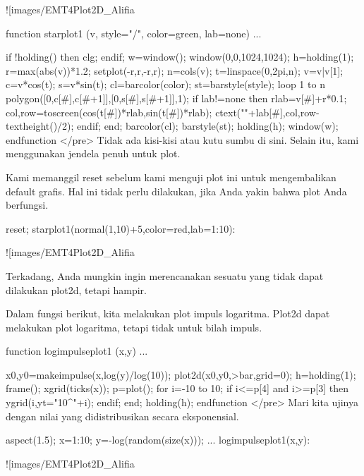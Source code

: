 \documentclass{article}
\begin{document}
![images/EMT4Plot2D_Alifia%

\>function starplot1 (v, style="/", color=green, lab=none) ...


      if !holding() then clg; endif;
      w=window(); window(0,0,1024,1024);
      h=holding(1);
      r=max(abs(v))*1.2;
      setplot(-r,r,-r,r);
      n=cols(v); t=linspace(0,2pi,n);
      v=v|v[1]; c=v*cos(t); s=v*sin(t);
      cl=barcolor(color); st=barstyle(style);
      loop 1 to n
        polygon([0,c[#],c[#+1]],[0,s[#],s[#+1]],1);
        if lab!=none then
          rlab=v[#]+r*0.1;
          {col,row}=toscreen(cos(t[#])*rlab,sin(t[#])*rlab);
          ctext(""+lab[#],col,row-textheight()/2);
        endif;
      end;
      barcolor(cl); barstyle(st);
      holding(h);
      window(w);
    endfunction
</pre>
Tidak ada kisi-kisi atau kutu sumbu di sini. Selain itu, kami
menggunakan jendela penuh untuk plot.


Kami memanggil reset sebelum kami menguji plot ini untuk mengembalikan
default grafis. Hal ini tidak perlu dilakukan, jika Anda yakin bahwa
plot Anda berfungsi.


\>reset; starplot1(normal(1,10)+5,color=red,lab=1:10):


![images/EMT4Plot2D_Alifia%

Terkadang, Anda mungkin ingin merencanakan sesuatu yang tidak dapat
dilakukan plot2d, tetapi hampir.


Dalam fungsi berikut, kita melakukan plot impuls logaritma. Plot2d
dapat melakukan plot logaritma, tetapi tidak untuk bilah impuls.


\>function logimpulseplot1 (x,y) ...


      {x0,y0}=makeimpulse(x,log(y)/log(10));
      plot2d(x0,y0,>bar,grid=0);
      h=holding(1);
      frame();
      xgrid(ticks(x));
      p=plot();
      for i=-10 to 10;
        if i<=p[4] and i>=p[3] then
           ygrid(i,yt="10^"+i);
        endif;
      end;
      holding(h);
    endfunction
</pre>
Mari kita ujinya dengan nilai yang didistribusikan secara
eksponensial.


\>aspect(1.5); x=1:10; y=-log(random(size(x))); ...  
\>   logimpulseplot1(x,y):


![images/EMT4Plot2D_Alifia%
\end{document}
